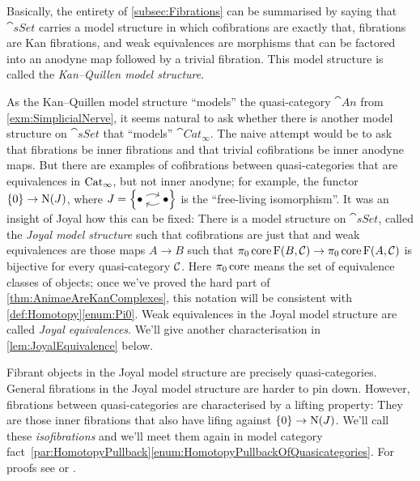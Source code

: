 \begin{exm}\label{exm:KanQuillenModelStructure}
	Basically, the entirety of \cref{subsec:Fibrations} can be summarised by saying that $\cat{sSet}$ carries a model structure in which cofibrations are exactly that, fibrations are Kan fibrations, and weak equivalences are morphisms that can be factored into an anodyne map followed by a trivial fibration. This model structure is called the \emph{Kan--Quillen model structure}.
\end{exm}
\begin{exm}\label{exm:JoyalModelStructure}
	As the Kan--Quillen model structure \enquote{models} the quasi-category $\cat{An}$ from  \cref{exm:SimplicialNerve}, it seems natural to ask whether there is another model structure on $\cat{sSet}$ that \enquote{models} $\cat{Cat}_\infty$. The naive attempt would be to ask that fibrations be inner fibrations and that trivial cofibrations be inner anodyne maps. But there are examples of cofibrations between quasi-categories that are equivalences in $\mathrm{Cat}_\infty$, but not inner anodyne; for example, the functor $\{0\}\rightarrow \operatorname{N}(J)$, where $J=\left\{\InlineJ\right\}$ is the \enquote{free-living isomorphism}. It was an insight of Joyal how this can be fixed: There is a model structure on $\cat{sSet}$, called the \emph{Joyal model structure} such that cofibrations are just that and weak equivalences are those maps $A\rightarrow B$ such that $\pi_0\operatorname{core}\operatorname{F}(B,\mathcal{C})\rightarrow \pi_0\operatorname{core}\operatorname{F}(A,\mathcal{C})$ is bijective for every quasi-category $\mathcal{C}$. Here $\pi_0\operatorname{core}$ means the set of equivalence classes of objects; once we've proved the hard part of \cref{thm:AnimaeAreKanComplexes}, this notation will be consistent with \cref{def:Homotopy}\cref{enum:Pi0}. Weak equivalences in the Joyal model structure are called \emph{Joyal equivalences}. We'll give another characterisation in \cref{lem:JoyalEquivalence} below.
	
	Fibrant objects in the Joyal model structure are precisely quasi-categories. General fibrations in the Joyal model structure are harder to pin down. However, fibrations between quasi-categories are characterised by a lifting property: They are those inner fibrations that also have lifing against $\{0\}\rightarrow\operatorname{N}(J)$. We'll call these \emph{isofibrations} and we'll meet them again in model category fact~\cref{par:HomotopyPullback}\cref{enum:HomotopyPullbackOfQuasicategories}. For proofs see \cite[Theorem~\href{https://mat.uab.cat/~kock/crm/hocat/advanced-course/Quadern45-2.pdf\#page=153}{6.12}]{JoyalQuasiCategoriesAndApplications} or \cite[Theorem~VIII.23]{HigherCatsII}.
\end{exm}
